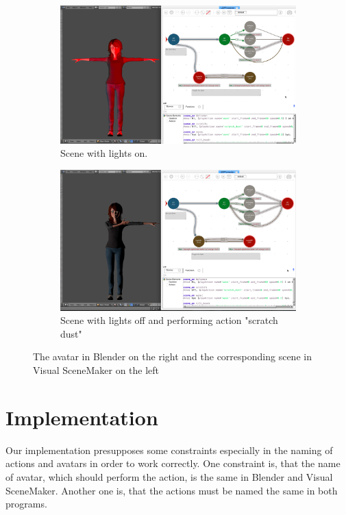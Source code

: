 \documentclass[
10pt, %
a4paper, %
oneside,
headinclude,footinclude, %
BCOR 0mm, %
]{scrartcl}
\begin{document}
\begin{figure}
\centering
\begin{subfigure}{.5\textwidth}
  \centering
  \includegraphics[width=.9\linewidth]{Figures/lightsOn.png}
  \caption{Scene with lights on.}
  \label{fig:sub1}
\end{subfigure}%
\begin{subfigure}{.5\textwidth}
  \centering
  \includegraphics[width=.9\linewidth]{Figures/lightsOff.png}
  \caption{Scene with lights off and performing action "scratch dust"}
  \label{fig:sub2}
\end{subfigure}
\caption{The avatar in Blender on the right and the corresponding scene in Visual SceneMaker on the left}
\label{fig:test}
\end{figure}


\section{Implementation}
Our implementation presupposes some constraints especially in the naming of actions and avatars in order to work correctly.
One constraint is, that the name of avatar, which should perform the action, is the same in Blender and Visual SceneMaker. Another one is, that the actions must be named the same in both programs.
\end{document}
